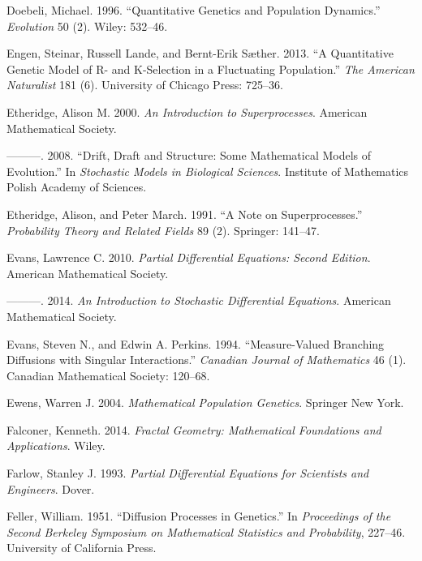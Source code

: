 \documentclass[]{article}
\begin{document}
\leavevmode\hypertarget{ref-Doebeli1996}{}%
Doebeli, Michael. 1996. ``Quantitative Genetics and Population
Dynamics.'' \emph{Evolution} 50 (2). Wiley: 532--46.

\leavevmode\hypertarget{ref-Engen2013}{}%
Engen, Steinar, Russell Lande, and Bernt-Erik Sæther. 2013. ``A
Quantitative Genetic Model of R- and K-Selection in a Fluctuating
Population.'' \emph{The American Naturalist} 181 (6). University of
Chicago Press: 725--36.

\leavevmode\hypertarget{ref-alisonetheridge2000}{}%
Etheridge, Alison M. 2000. \emph{An Introduction to Superprocesses}.
American Mathematical Society.

\leavevmode\hypertarget{ref-Etheridge2008}{}%
---------. 2008. ``Drift, Draft and Structure: Some Mathematical Models
of Evolution.'' In \emph{Stochastic Models in Biological Sciences}.
Institute of Mathematics Polish Academy of Sciences.

\leavevmode\hypertarget{ref-Etheridge1991}{}%
Etheridge, Alison, and Peter March. 1991. ``A Note on Superprocesses.''
\emph{Probability Theory and Related Fields} 89 (2). Springer: 141--47.

\leavevmode\hypertarget{ref-lawrenceevans2010}{}%
Evans, Lawrence C. 2010. \emph{Partial Differential Equations: Second
Edition}. American Mathematical Society.

\leavevmode\hypertarget{ref-9781470410544}{}%
---------. 2014. \emph{An Introduction to Stochastic Differential
Equations}. American Mathematical Society.

\leavevmode\hypertarget{ref-Evans1994}{}%
Evans, Steven N., and Edwin A. Perkins. 1994. ``Measure-Valued Branching
Diffusions with Singular Interactions.'' \emph{Canadian Journal of
Mathematics} 46 (1). Canadian Mathematical Society: 120--68.

\leavevmode\hypertarget{ref-Ewens2004}{}%
Ewens, Warren J. 2004. \emph{Mathematical Population Genetics}. Springer
New York.

\leavevmode\hypertarget{ref-kennethfalconer2014}{}%
Falconer, Kenneth. 2014. \emph{Fractal Geometry: Mathematical
Foundations and Applications}. Wiley.

\leavevmode\hypertarget{ref-stanleyfarlow1993}{}%
Farlow, Stanley J. 1993. \emph{Partial Differential Equations for
Scientists and Engineers}. Dover.

\leavevmode\hypertarget{ref-feller1951}{}%
Feller, William. 1951. ``Diffusion Processes in Genetics.'' In
\emph{Proceedings of the Second Berkeley Symposium on Mathematical
Statistics and Probability}, 227--46. University of California Press.
\end{document}
